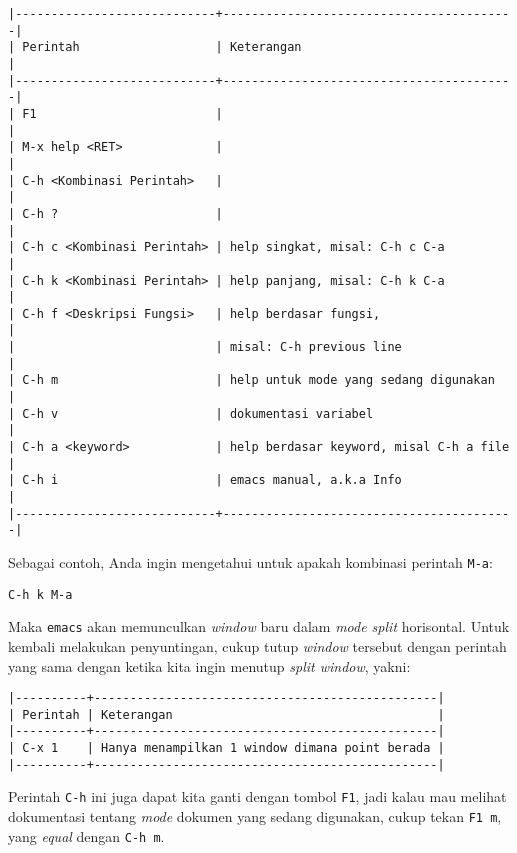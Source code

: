 \documentclass{article}
\begin{document}
\begin{verbatim}
|----------------------------+-----------------------------------------|
| Perintah                   | Keterangan                              |
|----------------------------+-----------------------------------------|
| F1                         |                                         |
| M-x help <RET>             |                                         |
| C-h <Kombinasi Perintah>   |                                         |
| C-h ?                      |                                         |
| C-h c <Kombinasi Perintah> | help singkat, misal: C-h c C-a          |
| C-h k <Kombinasi Perintah> | help panjang, misal: C-h k C-a          |
| C-h f <Deskripsi Fungsi>   | help berdasar fungsi,                   |
|                            | misal: C-h previous line                |
| C-h m                      | help untuk mode yang sedang digunakan   |
| C-h v                      | dokumentasi variabel                    |
| C-h a <keyword>            | help berdasar keyword, misal C-h a file |
| C-h i                      | emacs manual, a.k.a Info                |
|----------------------------+-----------------------------------------|
\end{verbatim}

Sebagai contoh, Anda ingin mengetahui untuk apakah kombinasi perintah
\verb=M-a=:

\begin{verbatim}
C-h k M-a
\end{verbatim}

Maka \verb=emacs= akan memunculkan \emph{window} baru dalam \emph{mode split}
horisontal. Untuk kembali melakukan penyuntingan, cukup tutup \emph{window}
tersebut dengan perintah yang sama dengan ketika kita ingin menutup 
\emph{split window}, yakni:

\begin{verbatim}
|----------+------------------------------------------------|
| Perintah | Keterangan                                     |
|----------+------------------------------------------------|
| C-x 1    | Hanya menampilkan 1 window dimana point berada |
|----------+------------------------------------------------|
\end{verbatim}

Perintah \verb=C-h= ini juga dapat kita ganti dengan tombol \verb=F1=, jadi 
kalau mau melihat dokumentasi tentang \emph{mode} dokumen yang sedang
digunakan, cukup tekan \verb=F1 m=, yang \emph{equal} dengan \verb=C-h m=.
\end{document}
